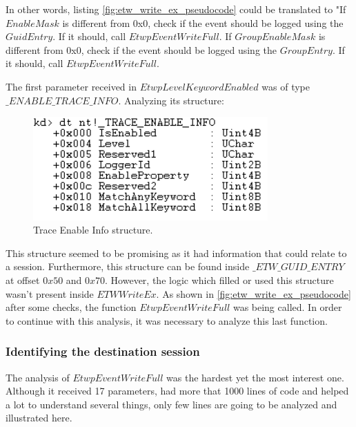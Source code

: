 In other words, listing \ref{fig:etw_write_ex_pseudocode} could be translated to "If $EnableMask$ is different from 0x0, check if the event should be logged using the $GuidEntry$. If it should, call $EtwpEventWriteFull$. If $GroupEnableMask$ is different from 0x0, check if the event should be logged using the $GroupEntry$. If it should, call $EtwpEventWriteFull$.


The first parameter received in $EtwpLevelKeywordEnabled$ was of type $\_ENABLE\_TRACE\_INFO$. Analyzing its structure: 

\begin{centering}
  \begin{figure}[H]
    \includegraphics[width=9cm]{images/trace_enable_info.png}
    \caption[]{Trace Enable Info structure.}
    \label{fig:trace_enable_info}
  \end{figure}
\end{centering}

This structure seemed to be promising as it had information that could relate to a session. Furthermore, this structure can be found inside $\_ETW\_GUID\_ENTRY$ at offset $0x50$ and $0x70$. However, the logic which filled or used this structure wasn't present inside $ETWWriteEx$. As shown in \ref{fig:etw_write_ex_pseudocode} after some checks, the function $EtwpEventWriteFull$ was being called. In order to continue with this analysis, it was necessary to analyze this last function. 


\subsubsection{\bfseries Identifying the destination session}

The analysis of $EtwpEventWriteFull$ was the hardest yet the most interest one. Although it received 17 parameters, had more that 1000 lines of code and helped a lot to understand several things, only few lines are going to be analyzed and illustrated here. 

